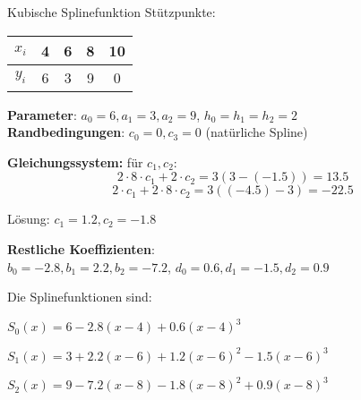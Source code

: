 \begin{example2}{Kubische Splinefunktion}
Stützpunkte:
\begin{center}
\begin{tabular}{|c|c|c|c|c|}
\hline
$x_i$ & 4 & 6 & 8 & 10 \\
\hline
$y_i$ & 6 & 3 & 9 & 0 \\
\hline
\end{tabular}
\end{center}
\textbf{Parameter}: $a_0 = 6, a_1 = 3, a_2 = 9$, $h_0 = h_1 = h_2 = 2$\\
\textbf{Randbedingungen}: $c_0 = 0, c_3 = 0$ (natürliche Spline)

\textbf{Gleichungssystem:} für $c_1, c_2$:
$$2 \cdot 8 \cdot c_1 + 2 \cdot c_2 = 3(3 - (-1.5)) = 13.5$$
$$2 \cdot c_1 + 2 \cdot 8 \cdot c_2 = 3((-4.5) - 3) = -22.5$$

Lösung: $c_1 = 1.2, c_2 = -1.8$

\textbf{Restliche Koeffizienten}:\\
$b_0 = -2.8, b_1 = 2.2, b_2 = -7.2$, 
$d_0 = 0.6, d_1 = -1.5, d_2 = 0.9$

Die Splinefunktionen sind:

$S_0(x) = 6 - 2.8(x-4) + 0.6(x-4)^3$

$S_1(x) = 3 + 2.2(x-6) + 1.2(x-6)^2 - 1.5(x-6)^3$

$S_2(x) = 9 - 7.2(x-8) - 1.8(x-8)^2 + 0.9(x-8)^3$
\end{example2}







